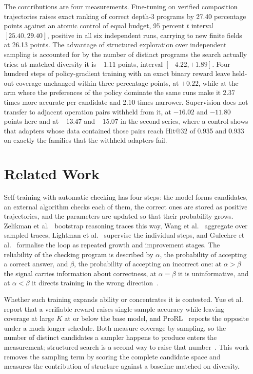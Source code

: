 \documentclass{zapiski}
\begin{document}
The contributions are four measurements. Fine-tuning on verified composition
trajectories raises exact ranking of correct depth-3 programs by 27.40 percentage
points against an atomic control of equal budget, 95 percent $t$ interval
$[25.40, 29.40]$, positive in all six independent runs, carrying to new finite fields
at 26.13 points. The advantage of structured exploration over independent sampling is
accounted for by the number of distinct programs the search actually tries: at matched
diversity it is $-1.11$ points, interval $[-4.22, +1.89]$. Four hundred steps of
policy-gradient training with an exact binary reward leave held-out coverage unchanged
within three percentage points, at $+0.22$, while at the arm where the preferences of
the policy dominate the same runs make it 2.37 times more accurate per candidate and
2.10 times narrower. Supervision does not transfer to adjacent operation pairs withheld
from it, at $-16.02$ and $-11.80$ points here and at $-13.47$ and $-15.07$ in the
second series, where a control shows that adapters whose data contained those pairs
reach Hit@32 of 0.935 and 0.933 on exactly the families that the withheld adapters
fail.

\section{Related Work}
\label{sec:related}

Self-training with automatic checking has four steps: the model forms candidates, an
external algorithm checks each of them, the correct ones are stored as positive
trajectories, and the parameters are updated so that their probability grows. Zelikman
et al.~\cite{zelikman2022star} bootstrap reasoning traces this way, Wang et
al.~\cite{wang2023selfconsistency} aggregate over sampled traces, Lightman et
al.~\cite{lightman2024verify} supervise the individual steps, and Gulcehre et
al.~\cite{gulcehre2023rest} formalise the loop as repeated growth and improvement
stages. The reliability of the checking program is described by $\alpha$, the
probability of accepting a correct answer, and $\beta$, the probability of accepting an
incorrect one: at $\alpha > \beta$ the signal carries information about correctness, at
$\alpha = \beta$ it is uninformative, and at $\alpha < \beta$ it directs training in the
wrong direction~\cite{cover2006information}.

Whether such training expands ability or concentrates it is contested. Yue et
al.~\cite{yue2025rl} report that a verifiable reward raises single-sample accuracy
while leaving coverage at large $K$ at or below the base model, and
ProRL~\cite{liu2025prorl} reports the opposite under a much longer schedule. Both
measure coverage by sampling, so the number of distinct candidates a sampler happens to
produce enters the measurement; structured search is a second way to raise that
number~\cite{yao2023tot}. This work removes the sampling term by scoring the complete
candidate space and measures the contribution of structure against a baseline matched
on diversity.
\end{document}

